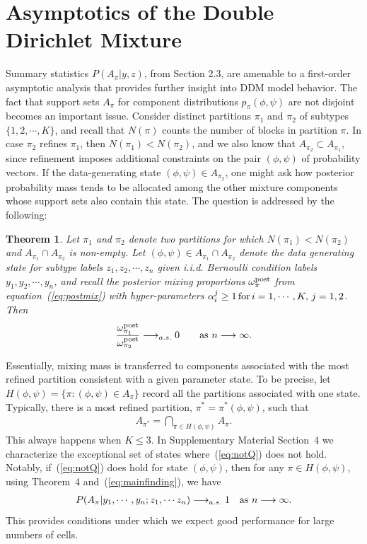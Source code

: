\documentclass[aoas,preprint]{imsart}
\newtheorem{theorem}{Theorem}
\begin{document}
\section{Asymptotics of the Double Dirichlet Mixture}
Summary statistics $P(A_\pi|y,z)$, from Section 2.3, are amenable to a first-order asymptotic analysis
that provides further insight into DDM model behavior.  The fact that support sets $A_\pi$ for component 
distributions $p_\pi( \phi,\psi)$ are not disjoint becomes an important issue.  Consider
distinct partitions $\pi_1$ and $\pi_2$  of subtypes $\{ 1, 2, \cdots, K\}$, and recall that $N(\pi)$ counts
 the number of blocks in partition $\pi$.   In case $\pi_2$ refines $\pi_1$, then $N(\pi_1) < N(\pi_2)$,
and  we also know that 
 $A_{\pi_2} \subset A_{\pi_1}$, since refinement 
imposes additional constraints on the pair $(\phi, \psi)$ of probability vectors.   
If the data-generating state $(\phi, \psi) \in A_{\pi_2}$, one might ask how posterior probability mass
tends to be allocated among the other mixture components whose
 support sets also contain this state.     The question is addressed 
by the following:

\begin{theorem}  Let $\pi_1$ and $\pi_2$ denote two partitions for which $N(\pi_1) < N(\pi_2)$
 and $A_{\pi_1} \cap A_{\pi_2}$ is non-empty. 
 Let $(\phi,\psi) \in A_{\pi_1} \cap A_{\pi_2}$ denote the data generating state for 
subtype labels $z_1, z_2, \cdots, z_n$ given i.i.d. Bernoulli condition labels $y_1, y_2, \cdots, y_n$, 
and recall the posterior mixing proportions $\omega^{\rm post}_\pi$ from equation~(\ref{eq:postmix}) with 
hyper-parameters $\alpha_i^j \geq 1 \, {\mbox {\rm for}} \,  i = 1, \cdots, K, \, j = 1,2$.   Then
\begin{eqnarray*}
\frac{\omega^{\rm post}_{\pi_1} }{ \omega^{\rm post}_{\pi_2} } \longrightarrow_{a.s.} 0 \qquad 
 {\mbox {\rm as $n \longrightarrow \infty$}}. 
\end{eqnarray*}
\end{theorem}
Essentially, mixing mass is transferred to components associated with the most refined partition
consistent with a given parameter state.  To be precise, let $H(\phi,\psi) = \{ \pi: (\phi,\psi) \in A_{\pi} \}$
record all the partitions associated with one state.   Typically, there is a most refined partition,
$\pi^* = \pi^*(\phi,\psi)$, such that
\begin{eqnarray}
\label{eq:notQ}
A_{\pi^*} = \bigcap_{\pi \in H(\phi,\psi)} A_\pi.
\end{eqnarray}
This always happens when $K \leq 3$.  In Supplementary Material Section~4 we characterize 
the exceptional set of states where~(\ref{eq:notQ}) does not hold.  Notably, if~(\ref{eq:notQ}) does hold for
state $(\phi,\psi)$, then for any $\pi \in H(\phi,\psi)$, using Theorem~4 and~(\ref{eq:mainfinding}), we have
\begin{eqnarray*}
P(A_\pi|y_1,\cdots,y_n; z_1, \cdots z_n ) \longrightarrow_{a.s.} 1 \quad {\mbox {\rm as $n \longrightarrow \infty$}}.
\end{eqnarray*}
This provides conditions under which we expect good performance for large numbers of cells.
\end{document}
